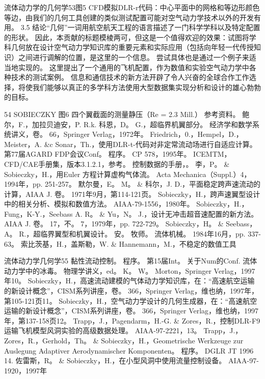 \documentclass[UTF8,11pt,a4paper,openany,fontset=fandol]{ctexbook}
\begin{document}
流体动力学的几何学53图5 CFD模拟DLR-r代码：中心平面中的网格和等边形颜色等边，由我们的几何工具创建的类似测试配置可能对空气动力学技术以外的开发有用。 3.5 结论“几何”一词用航空航天工程的语言描述了一门科学学科以及特定配置的形状。 因此，本贡献的标题模棱两可，但这是一个值得欢迎的效果：试图将学科几何放在设计空气动力学知识库的重要元素和实际应用（包括向年轻一代传授知识）之间进行调解的位置，是这里的一个信息。 尝试具体也是通过一个例子来适当地实现的。 这里提出了一个通用的飞机配置，作为数值和实验空气动力学中各种技术的测试案例。 信息和通信技术的新方法开辟了令人兴奋的全球合作工作选择，将使我们能够以真正的多学科方法使用大型数据集实现分析和设计的雄心勃勃的目标。

54 SOBIECZKY 图6 四个翼截面的测量静压（Re = 2.3 Mill.） 参考资料。 鲍尔，F.，加拉贝迪安，P. R.k. 科恩，D。 G.，超临界机翼部分。 经济学和数学系统讲义，卷。 66，Springer Verlag，1972年。 Friedrich，0.，Hempel，D.，Meister，A. \&c Sonar，Th.，使用DLR-t-代码对非定常流动场进行自适应计算。 第77届AGARD FDP会议Conf。 程序。 CP 578，1995年。 ICEMTM，CFD/CAE手册集，版本3.1.2.1，参考。 控制数据的手册，。 李，P。 \& Sobieczky，H.，用Euler 方程计算虚构气体流。 Acta Mechanica（Suppl.）4，1994年，pp. 251-257。 默尔曼，E。 M。 \& 科尔，J. D.，平面稳定跨声速流动的计算，AIAA J. 卷。 1971年9月，第114-121页。 Sobieczky，H.，跨声速翼型设计中的相关分析、模拟和数值方法。 AIAA-79-1556，1980年。 Sobieczky，H.，Fung，K-Y.，Seebass A. R。 \& Yu，N。 J.，设计无冲击超音速配置的新方法。 AIAA J. 卷。 17，不。 7，1979年，pp. 722-729。 Sobieczky，H。 \& Seebass，A。 R.，超临界翼型和机翼设计。 安。 牧师。 流体机械。 1984年16月，pp. 337-63。 索比茨基，H.，盖斯勒，W. \& Hannemann，M.，不稳定的数值工具

流体动力学几何学55 黏性流动控制。 程序。 第15届Int。 关于Num的Conf. 流体动力学中的冰毒。 物理学讲义，ed。 K。 W。 Morton，Springer Verlag，1997年10。 Sobieczky，H.，高速流动建模的气体动力学知识库，在：“高速航空运输的新设计概念”，CISM系列讲座，卷。 366，Springer Verlag，维也纳，1997年，第105-121页11。 Sobieczky，H.，空气动力学设计的几何生成器，在：“高速航空运输的新设计概念”，CISM系列讲座，卷。 366，Springer Verlag，维也纳，1997年，第137-158页12。 Trapp，J.，Pagendarm，H.-G. \& Zores，R.，控制DLR-F9运输飞机模型风洞实验的高级数据处理。 AIAA-97-2221，13。 Trapp，J.，Zores，R.，Gerhold，Th。 \& Sobieczky，H.，Geometrische Werkzeuge zur Auslegung Adaptiver Aerodynamischer Komponenten。 程序。 DGLR JT 1996 14. 佐雷斯，R。 \& Sobieczky，H.，在小型风洞中使用流量控制设备。 AIAA-97-1920，1997年

\clearpage
\end{document}
